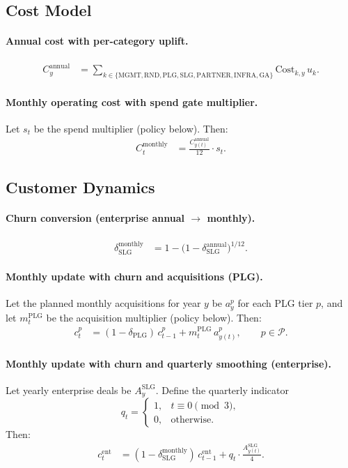 \documentclass[11pt, a4paper, oneside]{article}
\begin{document}
\newpage
\subsection{Cost Model}
\paragraph{Annual cost with per-category uplift.}
\begin{align}
C^{\mathrm{annual}}_y 
  &= \sum_{k \in \{\mathrm{MGMT},\mathrm{RND},\mathrm{PLG},\mathrm{SLG},\mathrm{PARTNER},\mathrm{INFRA},\mathrm{GA}\}}
     \mathrm{Cost}_{k,y}\, u_k.
\end{align}

\paragraph{Monthly operating cost with spend gate multiplier.}
Let $s_t$ be the spend multiplier (policy below). Then:
\begin{align}
C^{\mathrm{monthly}}_t 
  &= \frac{C^{\mathrm{annual}}_{y(t)}}{12} \cdot s_t.
\end{align}

\subsection{Customer Dynamics}
\paragraph{Churn conversion (enterprise annual $\to$ monthly).}
\begin{align}
\delta^{\mathrm{monthly}}_{\mathrm{SLG}} 
  &= 1 - \bigl(1 - \delta^{\mathrm{annual}}_{\mathrm{SLG}}\bigr)^{1/12}.
\end{align}

\paragraph{Monthly update with churn and acquisitions (PLG).}
Let the planned monthly acquisitions for year $y$ be $a^p_y$ for each PLG tier $p$, and let $m^{\mathrm{PLG}}_t$ be the acquisition multiplier (policy below). Then:
\begin{align}
c^p_t 
  &= (1-\delta_{\mathrm{PLG}})\, c^p_{t-1} + m^{\mathrm{PLG}}_t \, a^p_{y(t)}, 
  \qquad p \in \mathcal{P}.
\end{align}

\paragraph{Monthly update with churn and quarterly smoothing (enterprise).}
Let yearly enterprise deals be $A^{\mathrm{SLG}}_{y}$. Define the quarterly indicator
\[
q_t = 
\begin{cases}
1, & t \equiv 0 \pmod{3},\\
0, & \text{otherwise}.
\end{cases}
\]
Then:
\begin{align}
c^{\mathrm{ent}}_t 
  &= (1-\delta^{\mathrm{monthly}}_{\mathrm{SLG}})\, c^{\mathrm{ent}}_{t-1}
     + q_t \cdot \frac{A^{\mathrm{SLG}}_{y(t)}}{4}.
\end{align}
\end{document}
